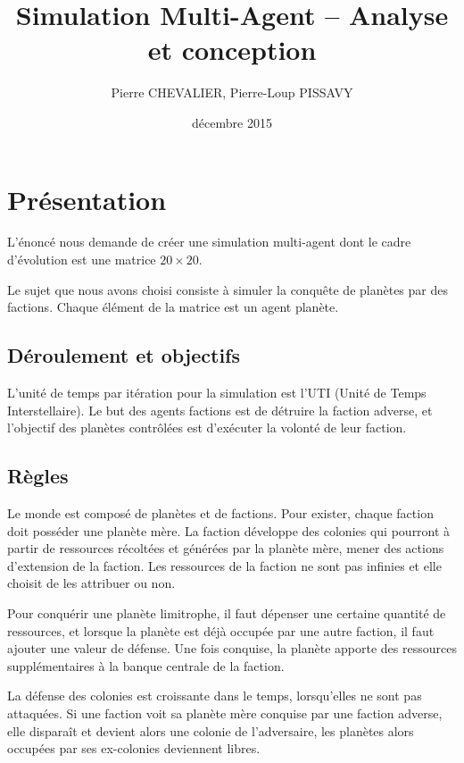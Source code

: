 \documentclass{article}
\title{Simulation Multi-Agent -- Analyse et conception}
\author{Pierre CHEVALIER, Pierre-Loup PISSAVY}
\date{décembre 2015}
\begin{document}
  \maketitle
  \setlength{\parskip}{10pt}

  \section{Présentation}

    L'énoncé nous demande de créer une simulation multi-agent dont le cadre d'évolution est une matrice $20 \times 20$.

    Le sujet que nous avons choisi consiste à simuler la conquête de planètes par des factions. Chaque élément de la matrice est un agent planète.

    \subsection{Déroulement et objectifs}

    L'unité de temps par itération pour la simulation est l'UTI (Unité de Temps Interstellaire). Le but des agents factions est de détruire la faction adverse, et l'objectif des planètes contrôlées est d'exécuter la volonté de leur faction.

    \subsection{Règles}
    Le monde est composé de planètes et de factions. Pour exister, chaque faction doit posséder une planète mère. La faction développe des colonies qui pourront à partir de ressources récoltées et générées par la planète mère, mener des actions d'extension de la faction. Les ressources de la faction ne sont pas infinies et elle choisit de les attribuer ou non.
  
    Pour conquérir une planète limitrophe, il faut dépenser une certaine quantité de ressources, et lorsque la planète est déjà occupée par une autre faction, il faut ajouter une valeur de défense. Une fois conquise, la planète apporte des ressources supplémentaires à la banque centrale de la faction.

    La défense des colonies est croissante dans le temps, lorsqu'elles ne sont pas attaquées. Si une faction voit sa planète mère conquise par une faction adverse, elle disparaît et devient alors une colonie de l'adversaire, les planètes alors occupées par ses ex-colonies deviennent libres. 
\end{document}
